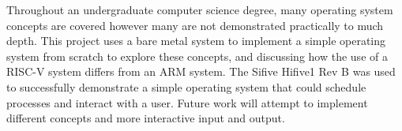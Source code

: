 
Throughout an undergraduate computer science degree, many operating system concepts are covered however many are not demonstrated practically to much depth. This project uses a bare metal system to implement a simple operating system from scratch to explore these concepts, and discussing how the use of a RISC-V system differs from an ARM system. The Sifive Hifive1 Rev B was used to successfully demonstrate a simple operating system that could schedule processes and interact with a user. Future work will attempt to implement different concepts and more interactive input and output.